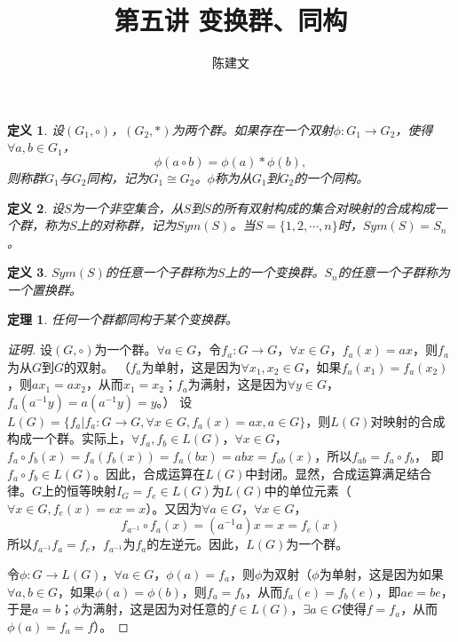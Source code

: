 \documentclass{article}
\newtheorem{Def}{定义}
\newtheorem{Thm}{定理}
\begin{document}
\begin{CJK*}{UTF8}{gbsn}
  \title{第五讲 变换群、同构}
  \author{陈建文}
  \maketitle
  
  \begin{Def}
    设$(G_1,\circ)$，$(G_2,*)$为两个群。如果存在一个双射$\phi:G_1\to G_2$，使得$\forall a,b\in G_1$，
    \[\phi(a\circ b)=\phi(a)* \phi(b),\]
    则称群$G_1$与$G_2$同构，记为$G_1\cong G_2$。$\phi$称为从$G_1$到$G_2$的一个同构。
  \end{Def}

  \begin{Def}
    设$S$为一个非空集合，从$S$到$S$的所有双射构成的集合对映射的合成构成一个群，称为$S$上的对称群，记为$Sym(S)$。当$S=\{1,2,\cdots,n\}$时，$Sym(S)=S_n$。
  \end{Def}

\begin{Def}
  $Sym(S)$的任意一个子群称为$S$上的一个变换群。$S_n$的任意一个子群称为一个置换群。
\end{Def}

\begin{Thm}
  任何一个群都同构于某个变换群。
\end{Thm}
\begin{proof}[证明]
  设$(G,\circ)$为一个群。$\forall a\in G$，令$f_a:G\to G$，$\forall x\in G$，$f_a(x)=ax$，则$f_a$为从$G$到$G$的双射。
  （$f_a$为单射，这是因为$\forall x_1,x_2\in G$，如果$f_a(x_1)=f_a(x_2)$，则$ax_1=ax_2$，从而$x_1=x_2$；$f_a$为满射，这是因为$\forall y\in G$，$f_a(a^{-1}y)=a(a^{-1}y)=y$。）
设$L(G)=\{f_a|f_a:G\to G,\forall x\in G,f_a(x)=ax,a\in G\}$，则$L(G)$对映射的合成构成一个群。实际上，$\forall f_a,f_b\in L(G)$，$\forall x\in G$，$f_a\circ f_b(x)=f_a(f_b(x))=f_a(bx)=abx=f_{ab}(x)$，所以$f_{ab}=f_a\circ f_b$，
即$f_a\circ f_b\in L(G)$。因此，合成运算在$L(G)$中封闭。显然，合成运算满足结合律。$G$上的恒等映射$I_G=f_e\in L(G)$为$L(G)$中的单位元素（$\forall x\in G,f_e(x)=ex=x$）。又因为$\forall a\in G$，$\forall x\in G$，
\[f_{a^{-1}}\circ f_a(x)=(a^{-1}a)x=x=f_e(x)\]
所以$f_{a^{-1}}f_a=f_e$，$f_{a^{-1}}$为$f_a$的左逆元。因此，$L(G)$为一个群。

令$\phi:G\to L(G)$，$\forall a\in G$，$\phi(a)=f_a$，则$\phi$为双射（$\phi$为单射，这是因为如果$\forall a,b\in G$，如果$\phi(a)=\phi(b)$，则$f_a=f_b$，从而$f_a(e)=f_b(e)$，即$ae=be$，于是$a=b$；$\phi$为满射，这是因为对任意的$f\in L(G)$，$\exists a\in G$使得$f=f_a$，从而$\phi(a)=f_a=f$）。


\end{proof}
\end{CJK*}
\end{document}
